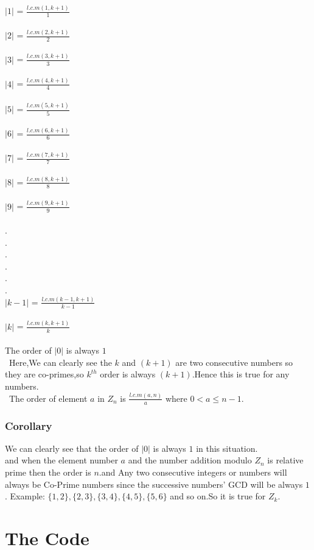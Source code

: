 \documentclass{article}
\begin{document}
$|1|$ = $\frac{l.c.m (1,k+1)}{1}  $\\\\
$|2|$ = $\frac{l.c.m (2,k+1)}{2}  $\\\\
$|3|$ = $\frac{l.c.m (3,k+1)}{3}  $\\\\
$|4|$ = $\frac{l.c.m (4,k+1)}{4}  $\\\\
$|5|$ = $\frac{l.c.m (5,k+1)}{5}  $\\\\
$|6|$ = $\frac{l.c.m (6,k+1)}{6}  $\\\\
$|7|$ = $\frac{l.c.m (7,k+1)}{7}  $\\\\
$|8|$ = $\frac{l.c.m (8,k+1)}{8}  $\\\\
$|9|$ = $\frac{l.c.m (9,k+1)}{9}  $\\\\
.\\
.\\
.\\
.\\
.\\
.\\
$|k-1|$ = $\frac{l.c.m (k-1,k+1)}{k-1}   $\\\\
$|k|$        = $\frac{l.c.m (k,k+1)}{k} $\\\\
The order of $|0|$ is always $1$\\\
Here,We can clearly see the $k$ and $(k+1)$ are two consecutive numbers so they are co-primes,so $k^{th}$ order is always $(k+1)$.Hence this is true for any numbers.\\\
The order of element $a$ in $Z_n$ is  ${\frac{l.c.m(a,n)}{a}}$ where $0<a\le n-1$.
\subsubsection{Corollary}
We can clearly see that the order of $|0|$ is always $1$ in this situation.\\
and when the element number $a$ and the number addition modulo $Z_n$ is relative prime then the order is $n$.and Any two consecutive integers or numbers will always be Co-Prime numbers since the successive numbers’ GCD will be always $1$. Example: $\{1,2\}, \{2,3\}, \{3,4\}, \{4,5\}, \{5,6\}$ and so on.So it is true for $Z_k$.
\section{The Code}
\end{document}
